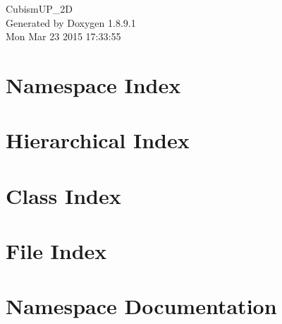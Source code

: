\documentclass[twoside]{book}
\newcommand{\+}{\discretionary{\mbox{\scriptsize$\hookleftarrow$}}{}{}}
\newcommand{\clearemptydoublepage}{%
  \newpage{\pagestyle{empty}\cleardoublepage}%
}
\begin{document}
\hypersetup{pageanchor=false,
             bookmarks=true,
             bookmarksnumbered=true,
             pdfencoding=unicode
            }
\begin{titlepage}
\vspace*{7cm}
\begin{center}%
{\Large Cubism\+U\+P\+\_\+2\+D }\\
\vspace*{1cm}
{\large Generated by Doxygen 1.8.9.1}\\
\vspace*{0.5cm}
{\small Mon Mar 23 2015 17:33:55}\\
\end{center}
\end{titlepage}
\clearemptydoublepage
\tableofcontents
\clearemptydoublepage
{}
\hypersetup{pageanchor=true}

\chapter{Namespace Index}

\chapter{Hierarchical Index}

\chapter{Class Index}

\chapter{File Index}

\chapter{Namespace Documentation}

\end{document}
